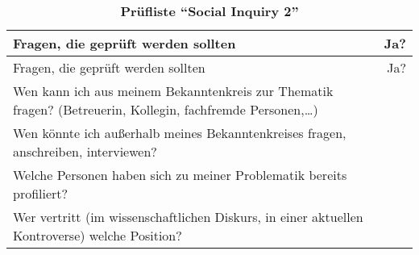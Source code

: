 \documentclass[]{article}
\begin{document}
\begin{longtable}[]{@{}lr@{}}
\caption{\textbf{Prüfliste ``Social Inquiry 2''}}\tabularnewline
\toprule
\begin{minipage}[b]{0.66\columnwidth}\raggedright\strut
Fragen, die geprüft werden sollten\strut
\end{minipage} & \begin{minipage}[b]{0.28\columnwidth}\raggedleft\strut
Ja?\strut
\end{minipage}\tabularnewline
\midrule
\endfirsthead
\toprule
\begin{minipage}[b]{0.66\columnwidth}\raggedright\strut
Fragen, die geprüft werden sollten\strut
\end{minipage} & \begin{minipage}[b]{0.28\columnwidth}\raggedleft\strut
Ja?\strut
\end{minipage}\tabularnewline
\midrule
\endhead
\begin{minipage}[t]{0.66\columnwidth}\raggedright\strut
Wen kann ich aus meinem Bekanntenkreis zur Thematik fragen? (Betreuerin,
Kollegin, fachfremde Personen,\ldots{})\strut
\end{minipage} & \begin{minipage}[t]{0.28\columnwidth}\raggedleft\strut
\strut
\end{minipage}\tabularnewline
\begin{minipage}[t]{0.66\columnwidth}\raggedright\strut
Wen könnte ich außerhalb meines Bekanntenkreises fragen, anschreiben,
interviewen?\strut
\end{minipage} & \begin{minipage}[t]{0.28\columnwidth}\raggedleft\strut
\strut
\end{minipage}\tabularnewline
\begin{minipage}[t]{0.66\columnwidth}\raggedright\strut
Welche Personen haben sich zu meiner Problematik bereits
profiliert?\strut
\end{minipage} & \begin{minipage}[t]{0.28\columnwidth}\raggedleft\strut
\strut
\end{minipage}\tabularnewline
\begin{minipage}[t]{0.66\columnwidth}\raggedright\strut
Wer vertritt (im wissenschaftlichen Diskurs, in einer aktuellen
Kontroverse) welche Position?\strut
\end{minipage} & \begin{minipage}[t]{0.28\columnwidth}\raggedleft\strut
\strut
\end{minipage}\tabularnewline

\end{longtable}
\end{document}
